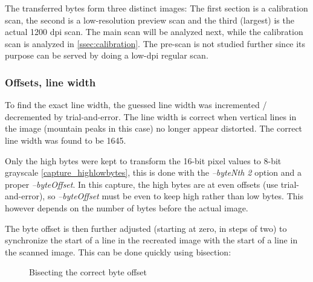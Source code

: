 \documentclass{article}
\begin{document}
The transferred bytes form three distinct images: The first section
is a calibration scan, the second is a low-resolution preview scan and the third (largest)
is the actual 1200 dpi scan. The main scan will be analyzed next,
while the calibration scan is analyzed in \autoref{ssec:calibration}.
The pre-scan is not studied further since its purpose can be served by
doing a low-dpi regular scan.

\subsubsection{Offsets, line width}

To find the exact line width, the guessed line width was incremented / decremented by trial-and-error.
The line width is correct when vertical lines in the image (mountain peaks in this case) no
longer appear distorted. The correct line width was found to be 1645.

Only the high bytes were kept to transform the 16-bit pixel values to 8-bit grayscale \autoref{capture_highlowbytes},
this is done with the {\it --byteNth 2} option and a proper {\it --byteOffset}. In this capture,
the high bytes are at even offsets (use trial-and-error), so {\it --byteOffset} must be even to keep
high rather than low bytes. This however depends on the number of bytes before the actual image.

The byte offset is then further adjusted (starting at zero, in steps of two)
to synchronize the start of a line in the recreated image
with the start of a line in the scanned image. This can be done quickly using bisection:

\begin{figure}[H]
    \centering
    \hspace{3em}
    \caption{Bisecting the correct byte offset}
    \label{extraction_first}

\end{figure}
\end{document}
